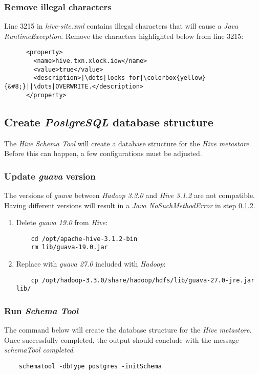 \documentclass{article}
\begin{document}
    \subsubsection{Remove illegal characters}
    Line 3215 in \emph{hive-site.xml} contains illegal characters that will cause a
    \emph{Java RuntimeException}. Remove the characters highlighted below from line 3215:
    \begin{verbatim}
      <property>
        <name>hive.txn.xlock.iow</name>
        <value>true</value>
        <description>|\dots|locks for|\colorbox{yellow}{&#8;}||\dots|OVERWRITE.</description>
      </property>
    \end{verbatim}
        
  \subsection{Create \emph{PostgreSQL} database structure}
  The \emph{Hive Schema Tool} will create a database structure for the \emph{Hive metastore}.
  Before this can happen, a few configurations must be adjusted.
        
    \subsubsection{Update \emph{guava} version}
    The versions of \emph{guava} between \emph{Hadoop 3.3.0} and \emph{Hive 3.1.2} are not
    compatible. Having different versions will result in a \emph{Java NoSuchMethodError} in step
    \ref{subsec:schematool}.
    \begin{enumerate}
    \item Delete \emph{guava 19.0} from \emph{Hive}:
    \begin{verbatim}
    cd /opt/apache-hive-3.1.2-bin
    rm lib/guava-19.0.jar
    \end{verbatim}
    
    \item Replace with \emph{guava 27.0} included with \emph{Hadoop}:
    \begin{verbatim}
    cp /opt/hadoop-3.3.0/share/hadoop/hdfs/lib/guava-27.0-jre.jar lib/
    \end{verbatim}
    \end{enumerate}
        
    \subsubsection{Run \emph{Schema Tool}}
    \label{subsec:schematool}
    The command below will create the database structure for the \emph{Hive metastore}. Once
    successfully completed, the output should conclude with the message
    \emph{schemaTool completed}.
    \begin{verbatim}
    schematool -dbType postgres -initSchema
    \end{verbatim}
        
\end{document}
